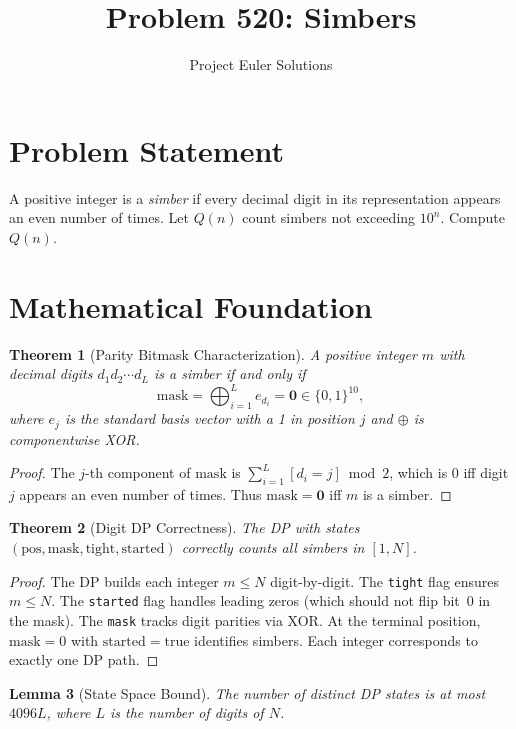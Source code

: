\documentclass[11pt]{article}
\title{Problem 520: Simbers}
\author{Project Euler Solutions}
\date{}
\newtheorem{theorem}{Theorem}
\newtheorem{lemma}[theorem]{Lemma}
\begin{document}
\maketitle

\section{Problem Statement}

A positive integer is a \emph{simber} if every decimal digit in its representation appears an even number of times. Let $Q(n)$ count simbers not exceeding $10^n$. Compute $Q(n)$.

\section{Mathematical Foundation}

\begin{theorem}[Parity Bitmask Characterization]
A positive integer $m$ with decimal digits $d_1 d_2 \cdots d_L$ is a simber if and only if
\[
\mathrm{mask} = \bigoplus_{i=1}^{L} e_{d_i} = \mathbf{0} \in \{0,1\}^{10},
\]
where $e_j$ is the standard basis vector with a 1 in position $j$ and $\oplus$ is componentwise XOR.
\end{theorem}

\begin{proof}
The $j$-th component of $\mathrm{mask}$ is $\sum_{i=1}^{L}[d_i = j] \bmod 2$, which is 0 iff digit $j$ appears an even number of times. Thus $\mathrm{mask} = \mathbf{0}$ iff $m$ is a simber.
\end{proof}

\begin{theorem}[Digit DP Correctness]
The DP with states $(\mathrm{pos}, \mathrm{mask}, \mathrm{tight}, \mathrm{started})$ correctly counts all simbers in $[1, N]$.
\end{theorem}

\begin{proof}
The DP builds each integer $m \leq N$ digit-by-digit. The \texttt{tight} flag ensures $m \leq N$. The \texttt{started} flag handles leading zeros (which should not flip bit~0 in the mask). The \texttt{mask} tracks digit parities via XOR. At the terminal position, $\mathrm{mask} = 0$ with $\mathrm{started} = \mathrm{true}$ identifies simbers. Each integer corresponds to exactly one DP path.
\end{proof}

\begin{lemma}[State Space Bound]
The number of distinct DP states is at most $4096L$, where $L$ is the number of digits of $N$.
\end{lemma}
\end{document}
